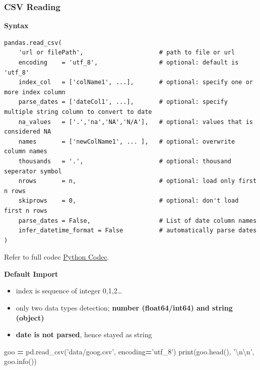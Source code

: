 \documentclass[
]{book}
\newenvironment{Shaded}{\begin{snugshade}}{\end{snugshade}}
\newcommand{\BuiltInTok}[1]{#1}
\newcommand{\CharTok}[1]{\textcolor[rgb]{0.5,0.5,0.5}{#1}}
\newcommand{\NormalTok}[1]{#1}
\newcommand{\OperatorTok}[1]{\textcolor[rgb]{0.43,0.43,0.43}{\textbf{#1}}}
\newcommand{\StringTok}[1]{\textcolor[rgb]{0.5,0.5,0.5}{#1}}
\providecommand{\tightlist}{%
  \setlength{\itemsep}{0pt}\setlength{\parskip}{0pt}}
\begin{document}
\hypertarget{csv-reading}{%
\subsubsection{CSV Reading}\label{csv-reading}}

\textbf{Syntax}

\begin{verbatim}
pandas.read_csv( 
    'url or filePath',                     # path to file or url 
    encoding    = 'utf_8',                 # optional: default is 'utf_8'
    index_col   = ['colName1', ...],       # optional: specify one or more index column
    parse_dates = ['dateCol1', ...],       # optional: specify multiple string column to convert to date
    na_values   = ['.','na','NA','N/A'],   # optional: values that is considered NA
    names       = ['newColName1', ... ],   # optional: overwrite column names
    thousands   = '.',                     # optional: thousand seperator symbol
    nrows       = n,                       # optional: load only first n rows
    skiprows    = 0,                       # optional: don't load first n rows
    parse_dates = False,                   # List of date column names
    infer_datetime_format = False          # automatically parse dates
)
\end{verbatim}

Refer to full codec \href{https://docs.python.org/3/library/codecs.html\#standard-encodings}{Python Codec}.

\textbf{Default Import}

\begin{itemize}
\tightlist
\item
  index is sequence of integer 0,1,2\ldots{}\\
\item
  only two data types detection; \textbf{number (float64/int64) and string (object)}\\
\item
  \textbf{date is not parsed}, hence stayed as string
\end{itemize}

\begin{Shaded}
\begin{Highlighting}[]
\NormalTok{goo }\OperatorTok{=}\NormalTok{ pd.read_csv(}\StringTok{'data/goog.csv'}\NormalTok{, encoding}\OperatorTok{=}\StringTok{'utf_8'}\NormalTok{)}
\BuiltInTok{print}\NormalTok{(goo.head(), }\StringTok{'}\CharTok{\textbackslash{}n\textbackslash{}n}\StringTok{'}\NormalTok{,}
\NormalTok{      goo.info())}
\end{Highlighting}
\end{Shaded}
\end{document}

